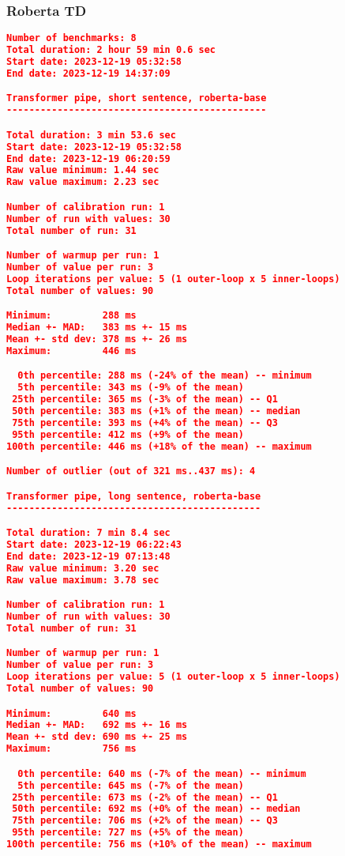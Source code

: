\subsubsection{Roberta TD}
\begin{lstlisting}[language=json]
Number of benchmarks: 8
Total duration: 2 hour 59 min 0.6 sec
Start date: 2023-12-19 05:32:58
End date: 2023-12-19 14:37:09

Transformer pipe, short sentence, roberta-base
----------------------------------------------

Total duration: 3 min 53.6 sec
Start date: 2023-12-19 05:32:58
End date: 2023-12-19 06:20:59
Raw value minimum: 1.44 sec
Raw value maximum: 2.23 sec

Number of calibration run: 1
Number of run with values: 30
Total number of run: 31

Number of warmup per run: 1
Number of value per run: 3
Loop iterations per value: 5 (1 outer-loop x 5 inner-loops)
Total number of values: 90

Minimum:         288 ms
Median +- MAD:   383 ms +- 15 ms
Mean +- std dev: 378 ms +- 26 ms
Maximum:         446 ms

  0th percentile: 288 ms (-24% of the mean) -- minimum
  5th percentile: 343 ms (-9% of the mean)
 25th percentile: 365 ms (-3% of the mean) -- Q1
 50th percentile: 383 ms (+1% of the mean) -- median
 75th percentile: 393 ms (+4% of the mean) -- Q3
 95th percentile: 412 ms (+9% of the mean)
100th percentile: 446 ms (+18% of the mean) -- maximum

Number of outlier (out of 321 ms..437 ms): 4

Transformer pipe, long sentence, roberta-base
---------------------------------------------

Total duration: 7 min 8.4 sec
Start date: 2023-12-19 06:22:43
End date: 2023-12-19 07:13:48
Raw value minimum: 3.20 sec
Raw value maximum: 3.78 sec

Number of calibration run: 1
Number of run with values: 30
Total number of run: 31

Number of warmup per run: 1
Number of value per run: 3
Loop iterations per value: 5 (1 outer-loop x 5 inner-loops)
Total number of values: 90

Minimum:         640 ms
Median +- MAD:   692 ms +- 16 ms
Mean +- std dev: 690 ms +- 25 ms
Maximum:         756 ms

  0th percentile: 640 ms (-7% of the mean) -- minimum
  5th percentile: 645 ms (-7% of the mean)
 25th percentile: 673 ms (-2% of the mean) -- Q1
 50th percentile: 692 ms (+0% of the mean) -- median
 75th percentile: 706 ms (+2% of the mean) -- Q3
 95th percentile: 727 ms (+5% of the mean)
100th percentile: 756 ms (+10% of the mean) -- maximum


\end{lstlisting}

